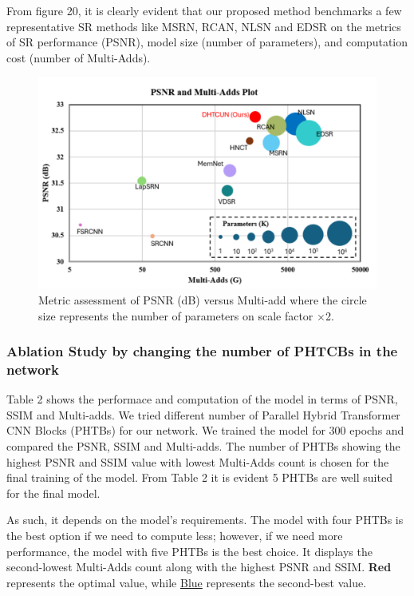 \documentclass{ieeeaccess}
\begin{document}
From figure 20, it is clearly evident that our proposed method benchmarks a few representative SR methods like MSRN, RCAN, NLSN and EDSR on the metrics of SR performance (PSNR), model size (number of parameters), and computation cost (number of Multi-Adds).



\begin{figure}
  \includegraphics[width=\linewidth]{20FIGURE.pdf}
  \caption{Metric assessment of PSNR (dB) versus Multi-add where the circle size represents the number of parameters on scale factor $\times$2.}
  \label{fig:20}
\end{figure}


\subsubsection{Ablation Study by changing the number of PHTCBs in the network}

Table 2 shows the performace and computation of the model in terms of PSNR, SSIM and Multi-adds. We tried different number of Parallel Hybrid Transformer CNN Blocks (PHTBs) for our network. We trained the model for 300 epochs and compared the PSNR, SSIM and Multi-adds. The number of PHTBs showing the highest PSNR and SSIM value with lowest Multi-Adds count is chosen for the final training of the model. From Table 2 it is evident 5 PHTBs are well suited for the final model.

As such, it depends on the model's requirements. The model with four PHTBs is the best option if we need to compute less; however, if we need more performance, the model with five PHTBs is the best choice. It displays the second-lowest Multi-Adds count along with the highest PSNR and SSIM. {\color{red}\textbf{Red}} represents the optimal value, while {\color{blue}\underline{Blue}} represents the second-best value.
\end{document}
